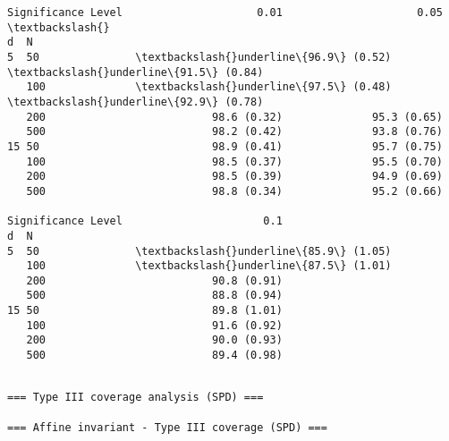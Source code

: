 \documentclass[11pt]{article}
\begin{document}
    
    \begin{Verbatim}[commandchars=\\\{\}]
Significance Level                     0.01                     0.05  \textbackslash{}
d  N                                                                   
5  50               \textbackslash{}underline\{96.9\} (0.52)  \textbackslash{}underline\{91.5\} (0.84)   
   100              \textbackslash{}underline\{97.5\} (0.48)  \textbackslash{}underline\{92.9\} (0.78)   
   200                          98.6 (0.32)              95.3 (0.65)   
   500                          98.2 (0.42)              93.8 (0.76)   
15 50                           98.9 (0.41)              95.7 (0.75)   
   100                          98.5 (0.37)              95.5 (0.70)   
   200                          98.5 (0.39)              94.9 (0.69)   
   500                          98.8 (0.34)              95.2 (0.66)   

Significance Level                      0.1  
d  N                                         
5  50               \textbackslash{}underline\{85.9\} (1.05)  
   100              \textbackslash{}underline\{87.5\} (1.01)  
   200                          90.8 (0.91)  
   500                          88.8 (0.94)  
15 50                           89.8 (1.01)  
   100                          91.6 (0.92)  
   200                          90.0 (0.93)  
   500                          89.4 (0.98)  
    \end{Verbatim}

    
    \begin{Verbatim}[commandchars=\\\{\}]

=== Type III coverage analysis (SPD) ===

=== Affine invariant - Type III coverage (SPD) ===
    \end{Verbatim}
\end{document}
